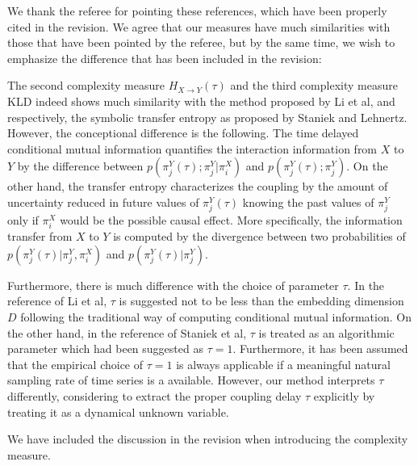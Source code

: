 \documentclass[aps,chaos,superscriptaddress,showkeys]{revtex4}
\begin{document}
\begin{center}
\begin{minipage}[c]{0.9\textwidth}
We thank the referee for pointing these references, which have been properly cited in the revision. We agree that our measures have much similarities with those that have been pointed by the referee, but by the same time, we wish to emphasize the difference that has been included in the revision: 

\vspace{0.5cm}
The second complexity measure $H_{X \to Y}(\tau)$ and the third complexity measure KLD indeed shows much similarity with the method proposed by Li et al, and respectively, the symbolic transfer entropy as proposed by Staniek and Lehnertz. However, the conceptional difference is the following. The time delayed conditional mutual information quantifies the interaction information from $X$ to $Y$ by the difference between $p(\pi_j^{Y}(\tau); \pi_j^{Y} | \pi_i^{X})$  and $p(\pi_j^{Y}(\tau); \pi_j^{Y})$. On the other hand, the transfer entropy characterizes the coupling by the amount of uncertainty reduced in future values of $\pi_j^{Y}(\tau)$ knowing the past values of $\pi_j^{Y}$ only if $\pi_i^{X}$ would be the possible causal effect. More specifically, the information transfer from $X$ to $Y$ is computed by the divergence between two probabilities of $p(\pi_j^{Y}(\tau) | \pi_j^{Y}, \pi_i^{X})$  and $p(\pi_j^{Y}(\tau) | \pi_j^{Y})$. 

\vspace{0.5cm}
Furthermore, there is much difference with the choice of parameter $\tau$. In the reference of Li et al, $\tau$ is suggested not to be less than the embedding dimension $D$ following the traditional way of computing conditional mutual information. On the other hand, in the reference of Staniek et al, $\tau$ is treated as an algorithmic parameter which had been suggested as $\tau = 1$. Furthermore, it has been assumed that the empirical choice of $\tau = 1$ is always applicable if a meaningful natural sampling rate of time series is a available. However, our method interprets $\tau$ differently, considering to extract the proper coupling delay $\tau$ explicitly by treating it as a dynamical unknown variable. 

\vspace{0.6cm}
We have included the discussion in the revision when introducing the complexity measure. 
\end{minipage}
\end{center}
\end{document}

